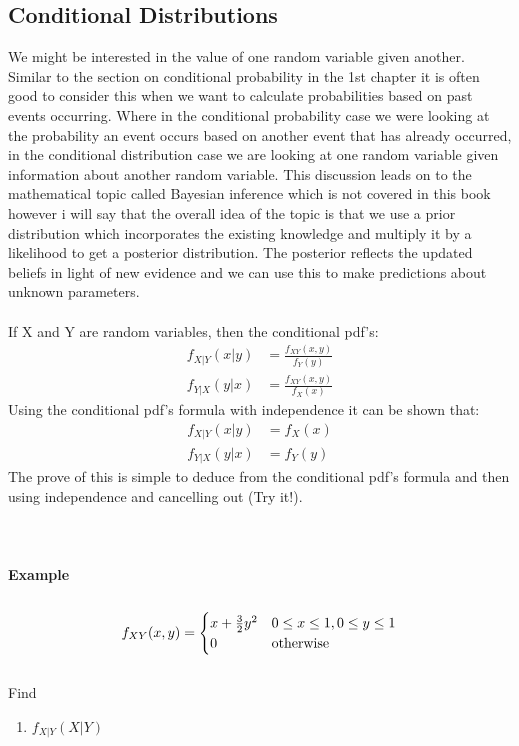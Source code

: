\documentclass[,oneside]{article}
\begin{document}
\begin{enumerate}
\subsection{Conditional Distributions}
We might be interested in the value of one random variable given another. Similar to the section on conditional probability in the 1st chapter it is often good to consider this when we want to calculate probabilities based on past events occurring. Where in the conditional probability case we were looking at the probability an event occurs based on another event that has already occurred, in the conditional distribution case we are looking at one random variable given information about another random variable. This discussion leads on to the mathematical topic called Bayesian inference which is not covered in this book however i will say that the overall idea of the topic is that we use a prior distribution which incorporates the existing knowledge and multiply it by a likelihood to get a posterior distribution. The posterior reflects the updated beliefs in light of new evidence and we can use this to make predictions about unknown parameters.\\ \\
If X and Y are random variables, then the conditional pdf's:
\begin{align*}
f_{X|Y}(x|y)&=\frac{f_{XY}(x,y)}{f_Y(y)}\\
f_{Y|X}(y|x)&=\frac{f_{XY}(x,y)}{f_X(x)}
\end{align*}
Using the conditional pdf's formula with independence it can be shown that:
\begin{align*}
f_{X|Y}(x|y)&=f_X(x)\\
f_{Y|X}(y|x)&=f_Y(y)
\end{align*}
The prove of this is simple to deduce from the conditional pdf's formula and then using independence and cancelling out (Try it!).\\ \\ \\ \\
\textbf{Example}\\ \\
\[
f_{XY}(x,y)=
\begin{cases}
x+\frac{3}{2}y^2 &  0 \leq x \leq 1, 0 \leq y \leq 1\\
0 & $otherwise$
\end{cases} \] \\
Find\\
\begin{enumerate}
\item $f_{X|Y}(X|Y)$

\end{enumerate}
\end{enumerate}
\end{document}
